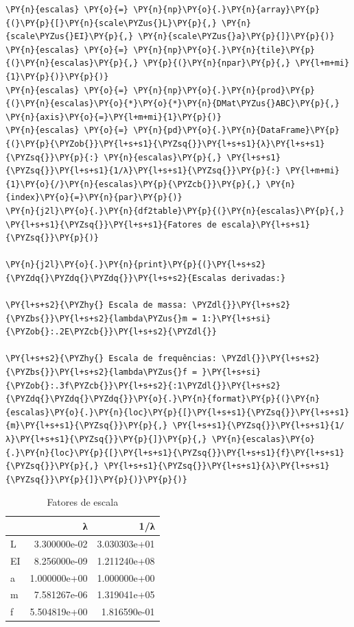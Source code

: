     \begin{tcolorbox}[breakable, size=fbox, boxrule=1pt, pad at break*=1mm,colback=cellbackground, colframe=cellborder]
\begin{Verbatim}[commandchars=\\\{\}]
\PY{n}{escalas} \PY{o}{=} \PY{n}{np}\PY{o}{.}\PY{n}{array}\PY{p}{(}\PY{p}{[}\PY{n}{scale\PYZus{}L}\PY{p}{,} \PY{n}{scale\PYZus{}EI}\PY{p}{,} \PY{n}{scale\PYZus{}a}\PY{p}{]}\PY{p}{)}
\PY{n}{escalas} \PY{o}{=} \PY{n}{np}\PY{o}{.}\PY{n}{tile}\PY{p}{(}\PY{n}{escalas}\PY{p}{,} \PY{p}{(}\PY{n}{npar}\PY{p}{,} \PY{l+m+mi}{1}\PY{p}{)}\PY{p}{)}
\PY{n}{escalas} \PY{o}{=} \PY{n}{np}\PY{o}{.}\PY{n}{prod}\PY{p}{(}\PY{n}{escalas}\PY{o}{*}\PY{o}{*}\PY{n}{DMat\PYZus{}ABC}\PY{p}{,} \PY{n}{axis}\PY{o}{=}\PY{l+m+mi}{1}\PY{p}{)}
\PY{n}{escalas} \PY{o}{=} \PY{n}{pd}\PY{o}{.}\PY{n}{DataFrame}\PY{p}{(}\PY{p}{\PYZob{}}\PY{l+s+s1}{\PYZsq{}}\PY{l+s+s1}{λ}\PY{l+s+s1}{\PYZsq{}}\PY{p}{:} \PY{n}{escalas}\PY{p}{,} \PY{l+s+s1}{\PYZsq{}}\PY{l+s+s1}{1/λ}\PY{l+s+s1}{\PYZsq{}}\PY{p}{:} \PY{l+m+mi}{1}\PY{o}{/}\PY{n}{escalas}\PY{p}{\PYZcb{}}\PY{p}{,} \PY{n}{index}\PY{o}{=}\PY{n}{par}\PY{p}{)}
\PY{n}{j2l}\PY{o}{.}\PY{n}{df2table}\PY{p}{(}\PY{n}{escalas}\PY{p}{,} \PY{l+s+s1}{\PYZsq{}}\PY{l+s+s1}{Fatores de escala}\PY{l+s+s1}{\PYZsq{}}\PY{p}{)}

\PY{n}{j2l}\PY{o}{.}\PY{n}{print}\PY{p}{(}\PY{l+s+s2}{\PYZdq{}\PYZdq{}\PYZdq{}}\PY{l+s+s2}{Escalas derivadas:}

\PY{l+s+s2}{\PYZhy{} Escala de massa: \PYZdl{}}\PY{l+s+s2}{\PYZbs{}}\PY{l+s+s2}{lambda\PYZus{}m = 1:}\PY{l+s+si}{\PYZob{}:.2E\PYZcb{}}\PY{l+s+s2}{\PYZdl{}}

\PY{l+s+s2}{\PYZhy{} Escala de frequências: \PYZdl{}}\PY{l+s+s2}{\PYZbs{}}\PY{l+s+s2}{lambda\PYZus{}f = }\PY{l+s+si}{\PYZob{}:.3f\PYZcb{}}\PY{l+s+s2}{:1\PYZdl{}}\PY{l+s+s2}{\PYZdq{}\PYZdq{}\PYZdq{}}\PY{o}{.}\PY{n}{format}\PY{p}{(}\PY{n}{escalas}\PY{o}{.}\PY{n}{loc}\PY{p}{[}\PY{l+s+s1}{\PYZsq{}}\PY{l+s+s1}{m}\PY{l+s+s1}{\PYZsq{}}\PY{p}{,} \PY{l+s+s1}{\PYZsq{}}\PY{l+s+s1}{1/λ}\PY{l+s+s1}{\PYZsq{}}\PY{p}{]}\PY{p}{,} \PY{n}{escalas}\PY{o}{.}\PY{n}{loc}\PY{p}{[}\PY{l+s+s1}{\PYZsq{}}\PY{l+s+s1}{f}\PY{l+s+s1}{\PYZsq{}}\PY{p}{,} \PY{l+s+s1}{\PYZsq{}}\PY{l+s+s1}{λ}\PY{l+s+s1}{\PYZsq{}}\PY{p}{]}\PY{p}{)}\PY{p}{)}
\end{Verbatim}
\end{tcolorbox}

    
    \begin{table}[H]
    \centering
    \caption{Fatores de escala}
    {\begin{tabular}{lrr}
\toprule
{} &             λ &           1/λ \\
\midrule
L  &  3.300000e-02 &  3.030303e+01 \\
EI &  8.256000e-09 &  1.211240e+08 \\
a  &  1.000000e+00 &  1.000000e+00 \\
m  &  7.581267e-06 &  1.319041e+05 \\
f  &  5.504819e+00 &  1.816590e-01 \\
\bottomrule
\end{tabular}
}
    \label{}
    \end{table}
    

